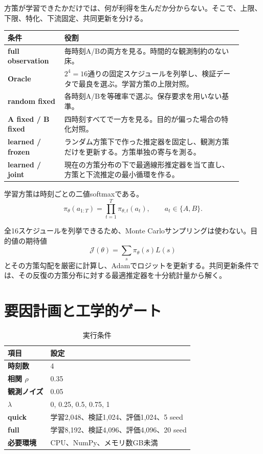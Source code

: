 \documentclass[11pt,a4paper]{ltjsarticle}
\begin{document}
方策が学習できたかだけでは、何が利得を生んだか分からない。そこで、上限、下限、特化、下流固定、共同更新を分ける。

\begin{longtable}{>{\bfseries}p{0.22\linewidth}p{0.69\linewidth}}
\toprule
条件 & 役割 \\
\midrule
\endhead
full observation & 毎時刻A/Bの両方を見る。時間的な観測制約のない床。\\
Oracle & $2^4=16$通りの固定スケジュールを列挙し、検証データで最良を選ぶ。学習方策の上限対照。\\
random fixed & 各時刻A/Bを等確率で選ぶ。保存要求を用いない基準。\\
A fixed / B fixed & 四時刻すべてで一方を見る。目的が偏った場合の特化対照。\\
learned / frozen & ランダム方策下で作った推定器を固定し、観測方策だけを更新する。方策単独の寄与を測る。\\
learned / joint & 現在の方策分布の下で最適線形推定器を当て直し、方策と下流推定の最小循環を作る。\\
\bottomrule
\end{longtable}

学習方策は時刻ごとの二値softmaxである。
\begin{equation}
\pi_\theta(a_{1:T})=\prod_{t=1}^{T}\pi_{\theta,t}(a_t),
\qquad a_t\in\{A,B\}.
\end{equation}

全16スケジュールを列挙できるため、Monte Carloサンプリングは使わない。目的値の期待値
\begin{equation}
\mathcal J(\theta)=\sum_s\pi_\theta(s)L(s)
\end{equation}
とその方策勾配を厳密に計算し、Adamでロジットを更新する。共同更新条件では、その反復の方策分布に対する最適推定器を十分統計量から解く。

\section{要因計画と工学的ゲート}

\begin{table}[ht]
\centering
\caption{実行条件}
\begin{tabularx}{0.92\linewidth}{>{\bfseries}lX}
\toprule
項目 & 設定 \\
\midrule
時刻数 & 4 \\
相関 $\rho$ & 0.35 \\
観測ノイズ & 0.05 \\
$\lambda$ & 0, 0.25, 0.5, 0.75, 1 \\
quick & 学習2,048、検証1,024、評価1,024、5 seed \\
full & 学習8,192、検証4,096、評価4,096、20 seed \\
必要環境 & CPU、NumPy、メモリ数GB未満 \\
\bottomrule
\end{tabularx}
\end{table}
\end{document}
